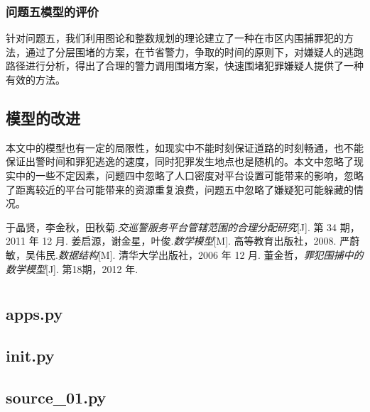 \documentclass{cumcmthesis}
\begin{document}
    \subsubsection{问题五模型的评价}
      针对问题五，我们利用图论和整数规划的理论建立了一种在市区内围捕罪犯的方法，通过了分层围堵的方案，在节省警力，争取的时间的原则下，对嫌疑人的逃跑路径进行分析，得出了合理的警力调用围堵方案，快速围堵犯罪嫌疑人提供了一种有效的方法。

  \subsection{模型的改进}

    本文中的模型也有一定的局限性，如现实中不能时刻保证道路的时刻畅通，也不能保证出警时间和罪犯逃逸的速度，同时犯罪发生地点也是随机的。本文中忽略了现实中的一些不定因素，问题四中忽略了人口密度对平台设置可能带来的影响，忽略了距离较近的平台可能带来的资源重复浪费，问题五中忽略了嫌疑犯可能躲藏的情况。


    \begin{thebibliography}{9}
      于晶贤，李金秋，田秋菊.{\it 交巡警服务平台管辖范围的合理分配研究}[J]. 第 34 期，2011 年 12 月.
      姜启源，谢金星，叶俊.{\it 数学模型}[M]. 高等教育出版社，2008.
      严蔚敏，吴伟民.{\it 数据结构}[M]. 清华大学出版社，2006 年 12 月.
      董金哲，{\it 罪犯围捕中的数学模型}[J]. 第18期，2012 年.
    \end{thebibliography}


    \newpage
    \appendix
\section{}
  \subsection{apps.py}
    

  \subsection{init.py}
    

  \subsection{source\_01.py}
    
\end{document}
